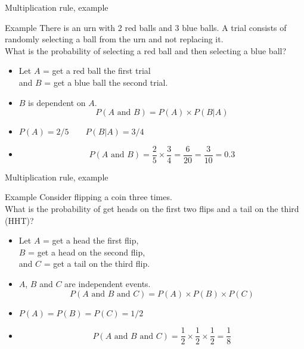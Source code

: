 \documentclass[xcolor=table, handout]{beamer}
\begin{document}
\begin{frame}{Multiplication rule, example}
\begin{exampleblock}{Example}
There is an urn with 2 red balls and 3 blue balls. A trial consists of randomly selecting a ball from the urn and not replacing it.\\
\medskip 
What is the probability of selecting a red ball and then selecting a blue ball?
\begin{itemize}
\pause
\item Let $A$ = get a red ball the first trial\\
 and $B$ = get a blue ball the second trial.\\

\pause
\item $B$ is dependent on $A$.
\[P(A \text{ and } B) = P(A) \times P(B|A)\]

\pause
\item $P(A) = 2/5 \qquad P(B|A) = 3/4$

\pause
\item
\[P(A \text{ and } B) = \frac 2 5 \times \frac 3 4 = \frac 6 {20} = \frac 3 {10} = 0.3\]

\end{itemize}

\end{exampleblock}
\end{frame}

\begin{frame}{Multiplication rule, example}
\begin{exampleblock}{Example}
Consider flipping a coin three times.\\
\medskip 
What is the probability of get heads on the first two flips and a tail on the third (HHT)?
\begin{itemize}
\pause
\item Let $A$ = get a head the first flip,\\
 $B$ = get a head on the second flip,\\
and $C$ = get a tail on the third flip.

\pause
\item $A$, $B$ and $C$ are independent events. 
\[P(A \text{ and } B \text{ and } C) = P(A) \times P(B) \times P(C)\]

\pause
\item $P(A) = P(B) = P(C) = 1/2$

\pause
\item
\[P(A \text{ and } B \text{ and } C) = \frac 1 2 \times \frac 1 2 \times \frac 1 2 = \frac 1 8\]

\end{itemize}

\end{exampleblock}
\end{frame}
\end{document}

